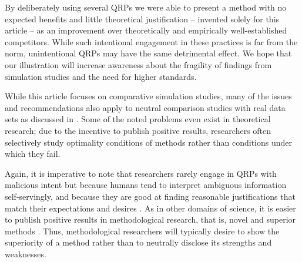 By deliberately using several QRPs we were able to present a method with no
expected benefits and little theoretical justification -- invented solely for
this article -- as an improvement over theoretically and empirically
well-established competitors. While such intentional engagement in these
practices is far from the norm, unintentional QRPs may have the same detrimental
effect. We hope that our illustration will increase awareness about the
fragility of findings from simulation studies and the need for higher standards.

While this article focuses on comparative simulation studies, many of the issues
and recommendations also apply to neutral comparison studies with real data sets
as discussed in \citet{Niessl2021}. Some of the noted problems even exist in
theoretical research; due to the incentive to publish positive results,
researchers often selectively study optimality conditions of methods rather than
conditions under which they fail.

Again, it is imperative to note that researchers rarely engage in QRPs with
malicious intent but because humans tend to interpret ambiguous information
self-servingly, and because they are good at finding reasonable justifications
that match their expectations and desires \citep{Simmons2011}. As in other
domains of science, it is easier to publish positive results in methodological
research, that is, novel and superior methods \citep{Boulesteix2015}. Thus,
methodological researchers will typically desire to show the superiority of a
method rather than to neutrally disclose its strengths and weaknesses.

